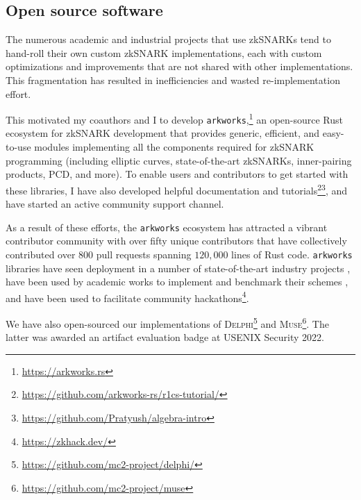 \documentclass[11pt,letterpaper]{article}
\theoremstyle{definition} %
\theoremstyle{remark} %
\newcommand{\arkworks}{\texttt{arkworks}}
\begin{document}
\subsection{Open source software}
\label{sec:oss}

\parhead{\arkworks{}: A Rust ecosystem for zkSNARKs}
The numerous academic and industrial projects that use zkSNARKs tend to hand-roll their own custom zkSNARK implementations, each with custom optimizations and improvements that are not shared with other implementations. This fragmentation has resulted in inefficiencies and wasted re-implementation effort.

This motivated my coauthors and I to develop \arkworks{},\footnote{\url{https://arkworks.rs}} an open-source Rust ecosystem for zkSNARK development that provides generic, efficient, and easy-to-use modules implementing all the components required for zkSNARK programming (including elliptic curves, state-of-the-art zkSNARKs, inner-pairing products, PCD, and more). To enable users and contributors to get started with these libraries, I have also developed helpful documentation and tutorials\footnote{\url{https://github.com/arkworks-rs/r1cs-tutorial/}}\footnote{\url{https://github.com/Pratyush/algebra-intro}}, and have started an active community support channel.

As a result of these efforts, the \arkworks{} ecosystem  has attracted a vibrant contributor community with over fifty unique contributors that have collectively contributed over 800 pull requests spanning $120,000$ lines of Rust code. \arkworks{} libraries have seen deployment in a number of state-of-the-art industry projects \cite{mina-general, celo, anoma, manta, EberhardtT18, Noir}, have been used by academic works to implement and benchmark their schemes \cite{BoweCGMMW20,ChiesaHMMVW20,ChenCDW20,BagheryPR20,BunzCLMS21,BunzMMTV19,ZhangX21,TyagiFBT21,ChuXZ21,FengQZDC21,GurkanJMMST21,KohlweissMSV21,IliadiMHSKFVL21}, and have been used to facilitate community hackathons\footnote{\url{https://zkhack.dev/}}.

We have also open-sourced our implementations of \textsc{Delphi}\footnote{\url{https://github.com/mc2-project/delphi/}} and \textsc{Muse}\footnote{\url{https://github.com/mc2-project/muse}}. The latter was awarded an artifact evaluation badge at USENIX Security 2022.
\end{document}
